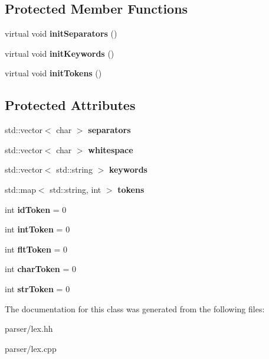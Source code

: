 \subsection*{Protected Member Functions}
\begin{DoxyCompactItemize}
\item 
\mbox{\label{classScanner_a488effb3d33811070936031ac5ba2db9}} 
virtual void {\bfseries init\+Separators} ()
\item 
\mbox{\label{classScanner_aa970e581e19054f2156669b18a92d769}} 
virtual void {\bfseries init\+Keywords} ()
\item 
\mbox{\label{classScanner_a6843db363c3000a726deabfc2c2fafec}} 
virtual void {\bfseries init\+Tokens} ()
\end{DoxyCompactItemize}
\subsection*{Protected Attributes}
\begin{DoxyCompactItemize}
\item 
\mbox{\label{classScanner_a62fa91ba90ccaa4ce5b1689d9d655374}} 
std\+::vector$<$ char $>$ {\bfseries separators}
\item 
\mbox{\label{classScanner_a34b919030a06f845b6e2b8f477b24fd7}} 
std\+::vector$<$ char $>$ {\bfseries whitespace}
\item 
\mbox{\label{classScanner_a24ca77baaf91e647a6a923c654e98426}} 
std\+::vector$<$ std\+::string $>$ {\bfseries keywords}
\item 
\mbox{\label{classScanner_acd5e5082f1b341bbd5ad527ab09e675a}} 
std\+::map$<$ std\+::string, int $>$ {\bfseries tokens}
\item 
\mbox{\label{classScanner_a9ec0066b29976ecc5ef37561f6dd29e3}} 
int {\bfseries id\+Token} = 0
\item 
\mbox{\label{classScanner_abc83a5f0255d955190f0ed31e9e019f7}} 
int {\bfseries int\+Token} = 0
\item 
\mbox{\label{classScanner_ae54fe4f587c2815953bbcb7a34fb9211}} 
int {\bfseries flt\+Token} = 0
\item 
\mbox{\label{classScanner_ad2d6d140773dd594dd28cf61666d657a}} 
int {\bfseries char\+Token} = 0
\item 
\mbox{\label{classScanner_a7b3c3be0cfd7aa37f8529249f1b7513c}} 
int {\bfseries str\+Token} = 0
\end{DoxyCompactItemize}


The documentation for this class was generated from the following files\+:\begin{DoxyCompactItemize}
\item 
parser/lex.\+hh\item 
parser/lex.\+cpp\end{DoxyCompactItemize}
